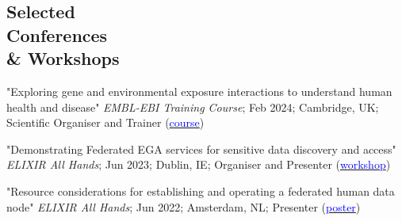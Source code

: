 \documentclass[margin,line]{res}
\begin{document}
\begin{resume}





\section{\sc Selected\\ Conferences\\ \& Workshops}


"Exploring gene and environmental exposure interactions to understand human health and disease" {\em EMBL-EBI Training Course}; Feb 2024; Cambridge, UK; Scientific Organiser and Trainer (\href{https://https://www.ebi.ac.uk/training/events/exploring-gene-and-environmental-exposure-interactions-understand-human-health-and-disease/}{\textcolor{blue}{course}})

"Demonstrating Federated EGA services for sensitive data discovery and access" {\em ELIXIR All Hands}; Jun 2023; Dublin, IE; Organiser and Presenter (\href{https://f1000research.com/slides/12-638}{\textcolor{blue}{workshop}})

"Resource considerations for establishing and operating a federated human data node" {\em ELIXIR All Hands}; Jun 2022; Amsterdam, NL; Presenter (\href{https://f1000research.com/posters/11-594}{\textcolor{blue}{poster}})



\end{resume}
\end{document}
